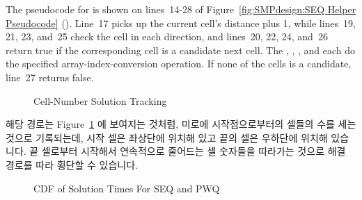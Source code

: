 The pseudocode for  is shown on lines~14-28
of Figure~\ref{fig:SMPdesign:SEQ Helper Pseudocode}
().
Line~17 picks up the current cell's distance plus 1,
while lines~19, 21, 23, and~25
check the cell in each direction, and lines~20, 22, 24, and~26
return true if the corresponding cell is a candidate next cell.
The , , , and 
each do the specified array-index-conversion operation.
If none of the cells is a candidate, line~27 returns false.
\fi

\begin{figure}[tb]
\centering
{}
\caption{Cell-Number Solution Tracking}
\label{fig:SMPdesign:Cell-Number Solution Tracking}
\end{figure}

해당 경로는 Figure~\ref{fig:SMPdesign:Cell-Number Solution Tracking} 에
보여지는 것처럼, 미로에 시작점으로부터의 셀들의 수를 세는 것으로 기록되는데,
시작 셀은 좌상단에 위치해 있고 끝의 셀은 우하단에 위치해 있습니다.
끝 셀로부터 시작해서 연속적으로 줄어드는 셀 숫자들을 따라가는 것으로 해결
경로를 따라 횡단할 수 있습니다.

\begin{figure}[tb]
\centering
{}
\caption{CDF of Solution Times For SEQ and PWQ}
\label{fig:SMPdesign:CDF of Solution Times For SEQ and PWQ}
\end{figure}

